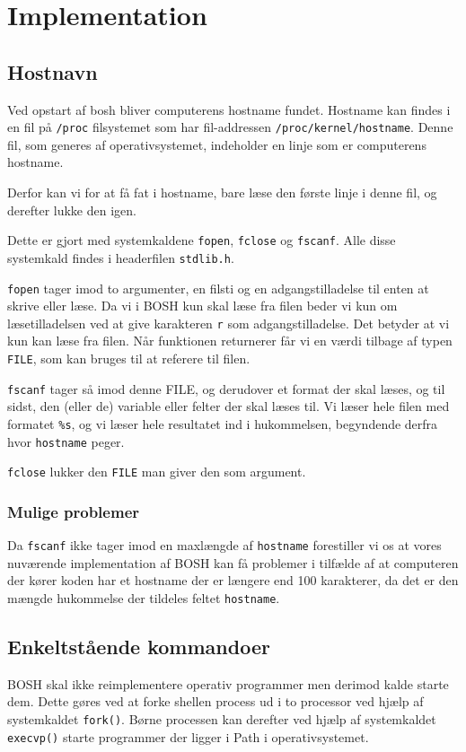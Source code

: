 \section{Implementation}
\subsection{Hostnavn}
Ved opstart af bosh bliver computerens hostname fundet. Hostname kan findes i en fil på \texttt{/proc} filsystemet som har fil-addressen \texttt{/proc/kernel/hostname}. Denne fil, som generes af operativsystemet, indeholder en linje som er computerens hostname.

Derfor kan vi for at få fat i hostname, bare læse den første linje i denne fil, og derefter lukke den igen.

Dette er gjort med systemkaldene \texttt{fopen}, \texttt{fclose} og \texttt{fscanf}. Alle disse systemkald findes i headerfilen \texttt{stdlib.h}.

\texttt{fopen} tager imod to argumenter, en filsti og en adgangstilladelse til enten at skrive eller læse. Da vi i BOSH kun skal læse fra filen beder vi kun om læsetilladelsen ved at give karakteren \texttt{r} som adgangstilladelse. Det betyder at vi kun kan læse fra filen. Når funktionen returnerer får vi en værdi tilbage af typen \texttt{FILE}, som kan bruges til at referere til filen.

\texttt{fscanf} tager så imod denne FILE, og derudover et format der skal læses, og til sidst, den (eller de) variable eller felter der skal læses til. Vi læser hele filen med formatet \texttt{\%s}, og vi læser hele resultatet ind i hukommelsen, begyndende derfra hvor \texttt{hostname} peger.

\texttt{fclose} lukker den \texttt{FILE} man giver den som argument.

\subsubsection{Mulige problemer}
Da \texttt{fscanf} ikke tager imod en maxlængde af \texttt{hostname} forestiller vi os at vores nuværende implementation af BOSH kan få problemer i tilfælde af at computeren der kører koden har et hostname der er længere end 100 karakterer, da det er den mængde hukommelse der tildeles feltet \texttt{hostname}.

\subsection{Enkeltstående kommandoer}
BOSH skal ikke reimplementere operativ programmer men derimod kalde starte dem. Dette gøres ved at forke shellen process ud i to processor ved hjælp af systemkaldet \verb+fork()+. Børne processen kan derefter ved hjælp af systemkaldet \verb+execvp()+ starte programmer der ligger i Path i operativsystemet. 

